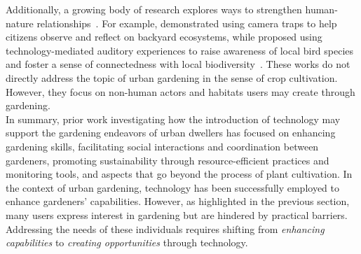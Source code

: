 Additionally, a growing body of research explores ways to strengthen human-nature relationships~\cite{Rodgers2020,Webber2023CHI}. For example, \citet{CameraTrap} demonstrated using camera traps to help citizens observe and reflect on backyard ecosystems, while \citet{AmbientBirdHouse} proposed using technology-mediated auditory experiences to raise awareness of local bird species and foster a sense of connectedness with local biodiversity~\cite{BirdHouseCompanion, AmbientBirdHouse}. These works do not directly address the topic of urban gardening in the sense of crop cultivation. However, they focus on non-human actors and habitats users may create through gardening.\\ 

In summary, prior work investigating how the introduction of technology may support the gardening endeavors of urban dwellers has focused on enhancing gardening skills, facilitating social interactions and coordination between gardeners, promoting sustainability through resource-efficient practices and monitoring tools, and aspects that go beyond the process of plant cultivation. In the context of urban gardening, technology has been successfully employed to enhance gardeners' capabilities. However, as highlighted in the previous section, many users express interest in gardening but are hindered by practical barriers. Addressing the needs of these individuals requires shifting from \textit{enhancing capabilities} to \textit{creating opportunities} through technology. 

